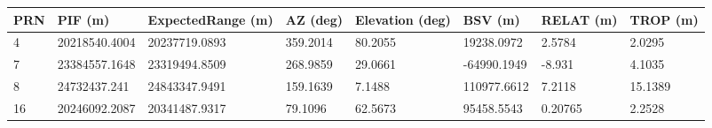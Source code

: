 \begin{tabular}{llllllll}
PRN & PIF (m) & ExpectedRange (m) & AZ (deg) & Elevation (deg) & BSV (m) & RELAT (m) & TROP (m) \\ 
\hline 
4 & 20218540.4004 & 20237719.0893 & 359.2014 & 80.2055 & 19238.0972 & 2.5784 & 2.0295 \\ 
7 & 23384557.1648 & 23319494.8509 & 268.9859 & 29.0661 & -64990.1949 & -8.931 & 4.1035 \\ 
8 & 24732437.241 & 24843347.9491 & 159.1639 & 7.1488 & 110977.6612 & 7.2118 & 15.1389 \\ 
16 & 20246092.2087 & 20341487.9317 & 79.1096 & 62.5673 & 95458.5543 & 0.20765 & 2.2528 \\ 
\hline 
\end{tabular}